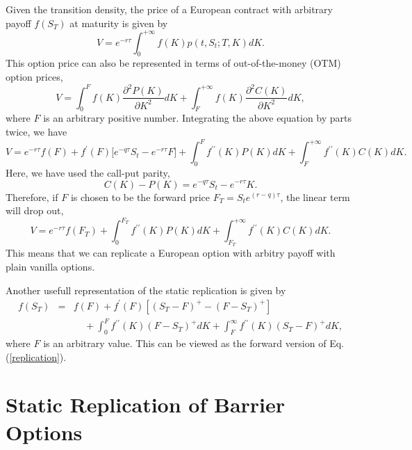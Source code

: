 \documentclass[12pt]{article}
\begin{document}
  Given the transition density, the price of a European contract with arbitrary payoff $f(S_T)$ at maturity is given by
  \begin{equation}
    V = e^{-r\tau}\int_{0}^{+\infty}f(K)p(t,S_t;T,K)dK.
  \end{equation}
  This option price can also be represented in terms of out-of-the-money (OTM) option prices,
  \begin{equation}
    V = \int_{0}^{F}f(K)\frac{\partial^2P(K)}{\partial K^2}dK + \int_{F}^{+\infty}f(K)\frac{\partial^2C(K)}{\partial K^2}dK,
  \end{equation}
  where $F$ is an arbitrary positive number. Integrating the above equation by parts twice, we have
  \begin{equation}
    V = e^{-r\tau}f(F) + f^{\prime}(F)\big[e^{-q\tau}S_t-e^{-r\tau}F\big] +
           \int_{0}^{F}f^{\prime\prime}(K)P(K)dK + \int_{F}^{+\infty}f^{\prime\prime}(K)C(K)dK.
    \label{replication}
  \end{equation}
  Here, we have used the call-put parity,
  \begin{equation}
    C(K) - P(K) = e^{-q\tau}S_t-e^{-r\tau}K.
  \end{equation}
  Therefore, if $F$ is chosen to be the forward price $F_T=S_te^{(r-q)\tau}$, the linear term will drop out,
  \begin{equation}
    V = e^{-r\tau}f(F_T) +
           \int_{0}^{F_T}f^{\prime\prime}(K)P(K)dK + \int_{F_T}^{+\infty}f^{\prime\prime}(K)C(K)dK.
  \end{equation}
  This means that we can replicate a European option with arbitry payoff with plain vanilla options.

  Another usefull representation of the static replication is given by
  \begin{eqnarray}
    f(S_T)&=&f(F)+f^{\prime}(F)\left[\left(S_T-F\right)^+-\left(F-S_T\right)^+\right]\nonumber\\
            &&\ \ \ \ \ +\int_0^Ff^{\prime\prime}(K)\left(F-S_T\right)^+dK+\int_F^{\infty}f^{\prime\prime}(K)\left(S_T-F\right)^+dK,
  \end{eqnarray}
  where $F$ is an arbitrary value. This can be viewed as the forward version of Eq. (\ref{replication}).


\section{Static Replication of Barrier Options}
\end{document}
